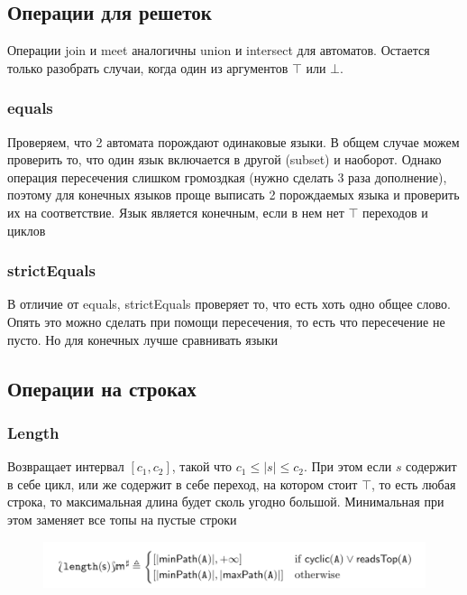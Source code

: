 \newpage
\subsection{Операции для решеток}
Операции join и meet аналогичны union и intersect для автоматов. Остается только разобрать случаи, когда один из аргументов $\top$ или $\bot$. 

\subsubsection*{equals}
Проверяем, что 2 автомата порождают одинаковые языки. В общем случае можем проверить то, что один язык включается в другой (subset) и наоборот. Однако операция пересечения слишком громоздкая (нужно сделать 3 раза дополнение), поэтому для конечных языков проще выписать 2 порождаемых языка и проверить их на соответствие. Язык является конечным, если в нем нет $\top$ переходов и циклов

\subsubsection*{strictEquals}
В отличие от equals, strictEquals проверяет то, что есть хоть одно общее слово. Опять это можно сделать при помощи пересечения, то есть что пересечение не пусто. Но для конечных лучше сравнивать языки





\newpage
\subsection{Операции на строках}
\subsubsection*{Length}
Возвращает интервал $[c_1, c_2]$, такой что $c_1 \leq |s| \leq c_2$. При этом если $s$ содержит в себе цикл, или же содержит в себе переход, на котором стоит $\top$, то есть любая строка, то максимальная длина будет сколь угодно большой. Минимальная при этом заменяет все топы на пустые строки
\begin{figure}[H]
\includegraphics[width=\textwidth]{images/tarsis-length.png}\hfill
\end{figure}

